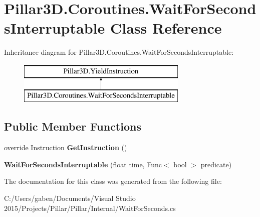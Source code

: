 \hypertarget{class_pillar3_d_1_1_coroutines_1_1_wait_for_seconds_interruptable}{}\section{Pillar3\+D.\+Coroutines.\+Wait\+For\+Seconds\+Interruptable Class Reference}
\label{class_pillar3_d_1_1_coroutines_1_1_wait_for_seconds_interruptable}
Inheritance diagram for Pillar3\+D.\+Coroutines.\+Wait\+For\+Seconds\+Interruptable\+:\begin{figure}[H]
\begin{center}
\leavevmode
\includegraphics[height=2.000000cm]{class_pillar3_d_1_1_coroutines_1_1_wait_for_seconds_interruptable}
\end{center}
\end{figure}
\subsection*{Public Member Functions}
\begin{DoxyCompactItemize}
\item 
\mbox{\label{class_pillar3_d_1_1_coroutines_1_1_wait_for_seconds_interruptable_acfdee8aeadb5a28acf02e8abcff4e69f}} 
override Instruction {\bfseries Get\+Instruction} ()
\item 
\mbox{\label{class_pillar3_d_1_1_coroutines_1_1_wait_for_seconds_interruptable_a3583ccebaafeb2f92d270310cf6aa0eb}} 
{\bfseries Wait\+For\+Seconds\+Interruptable} (float time, Func$<$ bool $>$ predicate)
\end{DoxyCompactItemize}


The documentation for this class was generated from the following file\+:\begin{DoxyCompactItemize}
\item 
C\+:/\+Users/gaben/\+Documents/\+Visual Studio 2015/\+Projects/\+Pillar/\+Pillar/\+Internal/Wait\+For\+Seconds.\+cs\end{DoxyCompactItemize}
